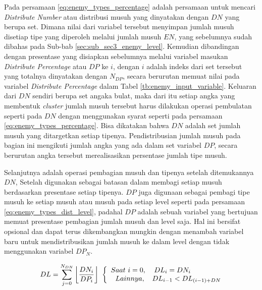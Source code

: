 Pada persamaan \ref{eq:enemy_types_percentage} adalah persamaan untuk mencari \textit{Distribute Number} atau distribusi musuh yang dinyatakan dengan $DN$ yang berupa set. Dimana nilai dari variabel tersebut menyimpan jumlah musuh disetiap tipe yang diperoleh melalui jumlah musuh $EN$, yang sebelumnya sudah dibahas pada Sub-bab \ref{sec:sub_sec3_enemy_level}. Kemudian dibandingan dengan presentase yang disiapkan sebelumnya melalui variabel masukan \textit{Distribute Percentage} atau $DP$ ke $i$, dengan $i$ adalah indeks dari set tersebut yang totalnya dinyatakan dengan $N_{DP}$, secara berurutan memuat nilai pada variabel \textit{Distribute Percentage} dalam Tabel \ref{tb:enemy_input_variable}. Keluaran dari $DN$ sendiri berupa set angaka bulat, maka dari itu setiap angka yang membentuk \textit{cluster} jumlah musuh tersebut harus dilakukan operasi pembulatan seperti pada $DN$ dengan menggunakan syarat seperti pada persamaan \ref{eq:enemy_types_percentage}. Bisa dikatakan bahwa $DN$ adalah set jumlah musuh yang ditargetkan setiap tipenya. Pendistribusian jumlah musuh pada bagian ini mengikuti jumlah angka yang ada dalam set variabel $DP$, secara berurutan angka tersebut merealisasikan persentase jumlah tipe musuh.
\vspace{1ex}

Selanjutnya adalah operasi pembagian musuh dan tipenya setelah ditemukannya $DN$, Setelah digunakan sebagai batasan dalam membagi setiap musuh berdasarkan presentase setiap tipenya. $DP$ juga digunaan sebagai pembagi tipe musuh ke setiap musuh atau musuh pada setiap level seperti pada persamaan \ref{eq:enemy_types_dist_level}, padahal $DP$ adalah sebuah variabel yang bertujuan memuat presentase pembagian jumlah musuh dan level saja. Hal ini bersifat opsional dan dapat terus dikembangkan mungkin dengan menambah variabel baru untuk mendistribusikan jumlah musuh ke dalam level dengan tidak menggunakan variabel $DP_{N}$.
\vspace{1ex}

\begin{equation}\label{eq:enemy_types_dist_level}
\begin{split}
DL = \sum_{j = 0}^{N_{DN}} \left \lfloor \frac{DN_{i}}{DP_{i}} \right \rfloor\
\left\{\begin{matrix} 
\hspace{0.5em} Saat\ i = 0, & \hspace{-4.0em}DL_{i} = DN_{i} \\ 
\hspace{1.0em} Lainnya, & DL_{i - 1} < DL_{(i - 1) + DN}
\end{matrix}\right.
\end{split}
\end{equation}

